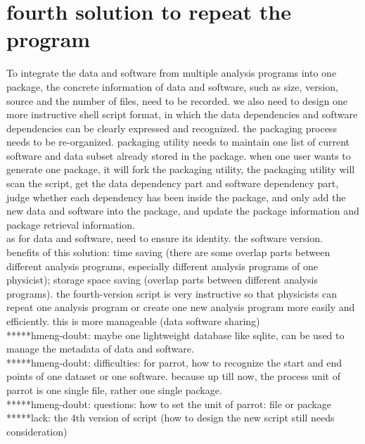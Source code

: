 \documentclass{article}
\begin{document}
\section{fourth solution to repeat the program}
\indent To integrate the data and software from multiple analysis programs into one package, the concrete information of data and software, such as size, version, source and the number of files, need to be recorded. we also need to design one more instructive shell script format, in which the data dependencies and software dependencies can be clearly expressed and recognized. the packaging process needs to be re-organized. packaging utility needs to maintain one list of current software and data subset already stored in the package. when one user wants to generate one package, it will fork the packaging utility, the packaging utility will scan the script, get the data dependency part and software dependency part, judge whether each dependency has been inside the package, and only add the new data and software into the package, and update the package information and package retrieval information.\\

as for data and software, need to ensure its identity. the software version.\\

benefits of this solution: time saving (there are some overlap parts between different analysis programs, especially different analysis programs of one physicist); storage space saving (overlap parts between different analysis programs). the fourth-version script is very instructive so that physicists can repeat one analysis program or create one new analysis program more easily and efficiently.  this is more manageable (data software sharing)\\

*****hmeng-doubt: maybe one lightweight database like sqlite, can be used to manage the metadata of data and software. \\

*****hmeng-doubt: difficulties: for parrot, how to recognize the start and end points of one dataset or one software. because up till now, the process unit of parrot is one single file, rather one single package.\\

*****hmeng-doubt: questions: how to set the unit of parrot: file or package\\

*****lack: the 4th version of script (how to design the new script still needs consideration)
\end{document}
